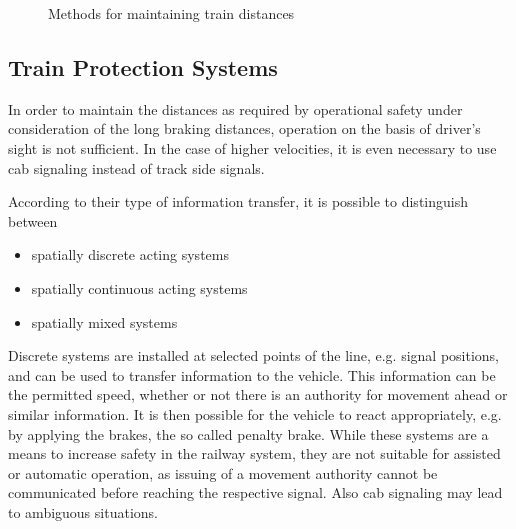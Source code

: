 \documentclass[a4paper, 12pt]{scrartcl}
\begin{document}
\begin{figure}
\begin{center}
\label{fig:AbsSpacDist}
\end{center}
\caption{Methods for maintaining train distances}
\label{fig:DistanceKeeping}
\end{figure}

\subsection{Train Protection Systems}
In order to maintain the distances as required by operational safety under consideration of the long braking distances, operation on the basis of driver's sight is not sufficient. In the case of higher velocities, it is even necessary to use cab signaling instead of track side signals.

 According to their type of information transfer, it is possible to distinguish between
 \begin{itemize}
	\item spatially discrete acting systems
	\item spatially continuous acting systems
	\item spatially mixed systems
\end{itemize}

Discrete systems are installed at selected points of the line, e.g. signal positions, and can be used to transfer information to the vehicle. This information can be the permitted speed, whether or not there is an authority for movement ahead or similar information. It is then possible for the vehicle to react appropriately, e.g. by applying the brakes, the so called penalty brake. While these systems are a means to increase safety in the railway system, they are not suitable for assisted or automatic operation, as issuing of a movement authority cannot be communicated before reaching the respective signal. Also cab signaling may lead to ambiguous situations.
\end{document}
